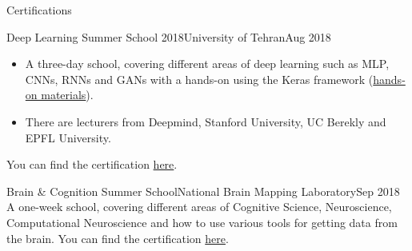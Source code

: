 \documentclass[]{mcdowellcv}
\begin{document}
\begin{cvsection}{Certifications}
    		\begin{cvsubsection}{Deep Learning Summer School 2018}{University of Tehran}{Aug 2018}
            	\begin{itemize}
            	    \item A three-day school, covering different areas of deep learning such as MLP, CNNs, RNNs and GANs with a hands-on using the Keras framework (\href{https://github.com/erfanMhi/Deep-Learning-Summer-School}{hands-on materials}).
                    \item There are lecturers from Deepmind, Stanford University, UC Berekly and EPFL University.
            	\end{itemize}
                You can find the certification \href{https://www.dropbox.com/s/i6jnb73ydrzsjbr/Deeplearning\%20Summer\%20School.jpg?dl=0}{here}.
    		\end{cvsubsection}
    		\begin{cvsubsection}{Brain \& Cognition Summer School}{National Brain Mapping Laboratory}{Sep 2018}
                A one-week school, covering different areas of Cognitive Science, Neuroscience, Computational Neuroscience and how to use various tools for getting data from the brain.
                You can find the certification \href{https://www.dropbox.com/s/46kc445t36e2yzi/photo_2018-09-07_14-08-06.jpg?dl=0}{here}.
    		\end{cvsubsection}
    \end{cvsection}
    
\end{document}
